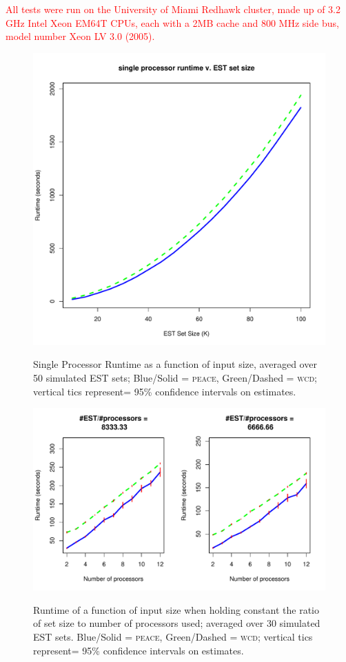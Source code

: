 \documentclass[a4paper,12pt]{article}
\newcommand{\mc}[1]{\textcolor{red}{#1}}
\begin{document}
\begin{appendix}
\mc{All tests were run on the University of Miami Redhawk cluster,
  made up of 3.2 GHz Intel Xeon EM64T CPUs, each with a 2MB cache and
  800 MHz side bus, model number Xeon LV 3.0 (2005).}

\begin{figure}[tbp]
\centerline{
\includegraphics[scale=0.35]{pics.d/seq_time.pdf}
\label{seq_runtime}
}
\caption{Single Processor Runtime as a function of input size,
  averaged over 50 simulated EST sets; Blue/Solid = \textsc{peace},
  Green/Dashed = \textsc{wcd}; vertical tics represent= 95\% confidence
  intervals on estimates.}
\end{figure}
\begin{figure}[tbp]
\centerline{
\includegraphics[scale=0.5]{pics.d/par_time.pdf}
\label{par_runtime}
}
\caption{Runtime of a function of input size when holding constant the
  ratio of set size to number of processors used; averaged over 30
  simulated EST sets.  Blue/Solid = \textsc{peace}, Green/Dashed = \textsc{wcd};
  vertical tics represent= 95\% confidence intervals on estimates.}
\end{figure}


\end{appendix}
\end{document}
